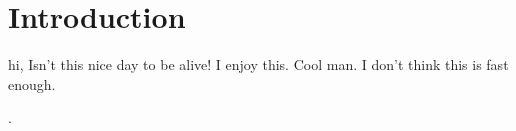 \documentclass{article}
\begin{document}
\section{Introduction}

hi, Isn't this nice day to be alive! I enjoy this.
Cool man. I don't think this is fast enough.

 .
\end{document}
